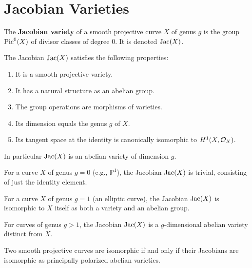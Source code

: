 \documentclass[12pt]{article}
\begin{document}
\section{Jacobian Varieties}

\begin{definition}
    The \textbf{Jacobian variety} of a smooth projective curve $X$ of genus $g$ is the group $\operatorname{Pic}^0(X)$ of divisor classes of degree 0. It is denoted $\operatorname{Jac}(X)$.
\end{definition}

\begin{proposition}
    The Jacobian $\operatorname{Jac}(X)$ satisfies the following properties:
    \begin{enumerate}
        \item It is a smooth projective variety.
        \item It has a natural structure as an abelian group.
        \item The group operations are morphisms of varieties.
        \item Its dimension equals the genus $g$ of $X$.
        \item Its tangent space at the identity is canonically isomorphic to $H^1(X, {\mathcal{O}}_X)$.
    \end{enumerate}
    In particular $\operatorname{Jac}(X)$ is an abelian variety of dimension $g$.
\end{proposition}


\begin{example}
    For a curve $X$ of genus $g = 0$ (e.g., $\mathbb{P}^1$), the Jacobian $\operatorname{Jac}(X)$ is trivial, consisting of just the identity element.
\end{example}

\begin{example}
    For a curve $X$ of genus $g = 1$ (an elliptic curve), the Jacobian $\operatorname{Jac}(X)$ is isomorphic to $X$ itself as both a variety and an abelian group.
\end{example}

\begin{example}
    For curves of genus $g > 1$, the Jacobian $\operatorname{Jac}(X)$ is a $g$-dimensional abelian variety distinct from $X$.
\end{example}

\begin{theorem}
    Two smooth projective curves are isomorphic if and only if their Jacobians are isomorphic as principally polarized abelian varieties.
\end{theorem}
\end{document}
